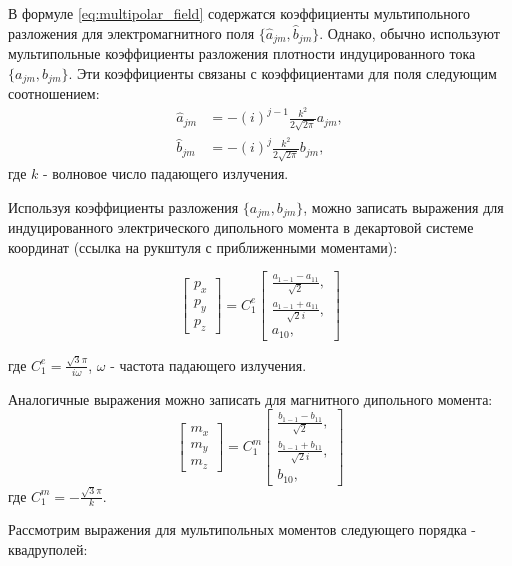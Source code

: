 В формуле \eqref{eq:multipolar_field} содержатся коэффициенты мультипольного разложения для электромагнитного поля $\{\hat{a}_{jm}, \hat{b}_{jm}\}$. Однако, обычно используют мультипольные коэффициенты разложения плотности индуцированного тока $\{a_{jm}, b_{jm}\}$. Эти коэффициенты связаны с коэффициентами для поля следующим соотношением:
\begin{align}
    \hat{a}_{jm} &= -(i)^{j-1} \frac{k^2}{2 \sqrt{2 \pi}} a_{jm},\\
    \hat{b}_{jm} &= -(i)^j \frac{k^2}{2 \sqrt{2 \pi}} b_{jm},
\end{align}
где $k$ - волновое число падающего излучения. 

Используя коэффициенты разложения $\{a_{jm}, b_{jm}\}$, можно записать выражения для индуцированного электрического дипольного момента в декартовой системе координат (ссылка на рукштуля с приближенными моментами):

\begin{equation}
    \begin{bmatrix}
        p_x \\
        p_y \\
        p_z
    \end{bmatrix} = C^e_1 \begin{bmatrix}
        \frac{a_{1-1} - a_{11}}{\sqrt{2}},\\
        \frac{a_{1-1}+a_{11}}{\sqrt{2}i},\\
        a_{10},
    \end{bmatrix}
\end{equation}

где $C_1^e = \frac{\sqrt{3} \pi}{i \omega}$, $\omega$ - частота падающего излучения.

Аналогичные выражения можно записать для магнитного дипольного момента:
\begin{equation}
    \begin{bmatrix}
        m_x \\
        m_y \\
        m_z
    \end{bmatrix} = C_1^m \begin{bmatrix}
        \frac{b_{1-1} - b_{11}}{\sqrt{2}},\\
        \frac{b_{1-1}+b_{11}}{\sqrt{2}i},\\
        b_{10},
    \end{bmatrix}
\end{equation}
где $C_1^m = -\frac{\sqrt{3} \pi}{k}$.

Рассмотрим выражения для мультипольных моментов следующего порядка - квадруполей:

